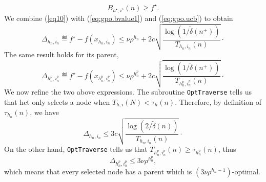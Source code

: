 \begin{equation} \label{eq10}
B_{h^\star,i^\star}(n) \geq f^\star.
\end{equation}
We combine (\ref{eq10}) with (\ref{eq:gpo.bvalue1}) and (\ref{eq:gpo.ucb}) to obtain
\begin{equation*} %
\Delta_{h_n,i_n} \eqdef f^\star - f(x_{h_n,i_n}) \leq \nu\rho^{h_n} + 2c\sqrt{\frac{\log(1/\tilde{\delta}(n^+))}{T_{h_n,i_n}(n)}}\cdot
\end{equation*}
The same result holds for its parent,
\begin{equation*} %
\Delta_{h_n^p,i_n^p} \eqdef f^\star - f(x_{h_n^p,i_n^p}) \leq \nu\rho^{h_n^p} + 2c\sqrt{\frac{\log(1/\tilde{\delta}(n^+))}{T_{h_n^p,i_n^p}(n)}}\cdot
\end{equation*}
We now refine the two above expressions. The subroutine \texttt{OptTraverse} tells us that \gls{hct} only selects a node when $T_{h,i}(N)<\tau_h(n)$. Therefore, by definition of $\tau_{h_n}(n)$, we have
\begin{equation}\label{eq:gpo.delta}
    \Delta_{h_n,i_n} \leq 3c\sqrt{\frac{\log(2/\tilde{\delta}(n))}{T_{h_n,i_n}(n)}}\cdot
\end{equation}
On the other hand,  \texttt{OptTraverse} tells us that $T_{h_n^p,i_n^p}(n)\geq\tau_{h_n^p}(n)$, thus
\begin{equation*} %
\Delta_{h_n^p,i_n^p} \leq 3\nu\rho^{h_n^p},
\end{equation*}
which means that every selected node has a parent which is $(3\nu\rho^{h_n-1})$-optimal.


